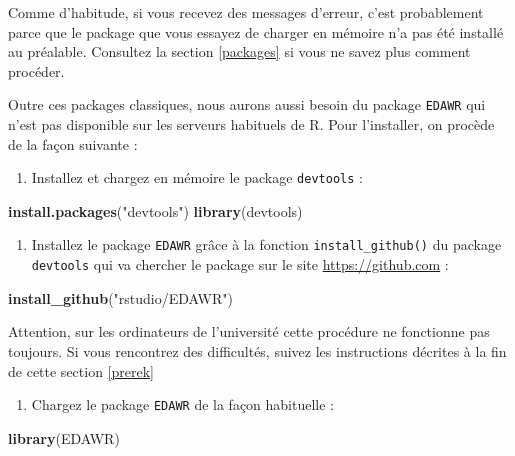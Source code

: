 \documentclass[a4paperpaper,]{article}
\newenvironment{Shaded}{\begin{snugshade}}{\end{snugshade}}
\newcommand{\KeywordTok}[1]{\textcolor[rgb]{0.12,0.11,0.11}{\textbf{#1}}}
\newcommand{\NormalTok}[1]{\textcolor[rgb]{0.12,0.11,0.11}{#1}}
\newcommand{\StringTok}[1]{\textcolor[rgb]{0.75,0.01,0.01}{#1}}
\providecommand{\tightlist}{%
  \setlength{\itemsep}{0pt}\setlength{\parskip}{0pt}}
\begin{document}
Comme d'habitude, si vous recevez des messages d'erreur, c'est probablement parce que le package que vous essayez de charger en mémoire n'a pas été installé au préalable. Consultez la section \ref{packages} si vous ne savez plus comment procéder.

Outre ces packages classiques, nous aurons aussi besoin du package \texttt{EDAWR} qui n'est pas disponible sur les serveurs habituels de R. Pour l'installer, on procède de la façon suivante :

\begin{enumerate}
\def\labelenumi{\arabic{enumi}.}
\tightlist
\item
  Installez et chargez en mémoire le package \texttt{devtools} :
\end{enumerate}

\begin{Shaded}
\begin{Highlighting}[]
\KeywordTok{install.packages}\NormalTok{(}\StringTok{"devtools"}\NormalTok{)}
\KeywordTok{library}\NormalTok{(devtools)}
\end{Highlighting}
\end{Shaded}

\begin{enumerate}
\def\labelenumi{\arabic{enumi}.}
\setcounter{enumi}{1}
\tightlist
\item
  Installez le package \texttt{EDAWR} grâce à la fonction \texttt{install\_github()} du package \texttt{devtools} qui va chercher le package sur le site \url{https://github.com} :
\end{enumerate}

\begin{Shaded}
\begin{Highlighting}[]
\KeywordTok{install_github}\NormalTok{(}\StringTok{"rstudio/EDAWR"}\NormalTok{)}
\end{Highlighting}
\end{Shaded}

Attention, sur les ordinateurs de l'université cette procédure ne fonctionne pas toujours. Si vous rencontrez des difficultés, suivez les instructions décrites à la fin de cette section \ref{prerek}

\begin{enumerate}
\def\labelenumi{\arabic{enumi}.}
\setcounter{enumi}{2}
\tightlist
\item
  Chargez le package \texttt{EDAWR} de la façon habituelle :
\end{enumerate}

\begin{Shaded}
\begin{Highlighting}[]
\KeywordTok{library}\NormalTok{(EDAWR)}
\end{Highlighting}
\end{Shaded}
\end{document}
